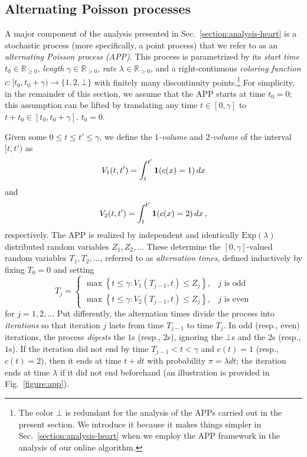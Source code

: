 \documentclass[11pt]{article}
\def\LongVersion{}
\def\LongVersionEnd{}
\def\ShortVersion{}
\def\ShortVersionEnd{}
\theoremstyle{definition}
\theoremstyle{plain}
\theoremstyle{definition}
\theoremstyle{plain}
\theoremstyle{definition}
\theoremstyle{plain}
\newenvironment{MathMaybe}[0]
{\begin{displaymath}\ignorespaces}
{\end{displaymath}\ignorespacesafterend}
\newenvironment{MathMaybe}[0]
{\begin{math}\ignorespaces}
{\end{math}}
\newcommand{\Sect}{Sec.}
\newcommand{\Fig}{Fig.}
\newcommand{\Reals}{\mathbb{R}}
\newcommand{\Indicator}{\mathbf{1}}
\newcommand{\ExpDist}{\mathrm{Exp}}
\begin{document}
\subsection{Alternating Poisson processes}
\label{section:alternating-Poisson-process}
A major component of the analysis presented in
\Sect{}~\ref{section:analysis-heart} is a stochastic process (more
specifically, a point process) that we refer to as an \emph{alternating
Poisson process (APP)}.
This process is parametrized by its
\emph{start time} $t_{0} \in \Reals_{\geq 0}$,
\emph{length} $\gamma \in \Reals_{> 0}$,
\emph{rate} $\lambda \in \Reals_{> 0}$, and
a right-continuous \emph{coloring function}
$c : [t_{0}, t_{0} + \gamma) \rightarrow \{ 1, 2, \bot \}$
with finitely many discontinuity points.\footnote{%
The color $\bot$ is redundant for the analysis of the APPs carried out in the
present section.
We introduce it because it makes things simpler in
\Sect{}~\ref{section:analysis-heart} when we employ the APP framework in the
analysis of our online algorithm.
}
For simplicity, in the remainder of this section, we assume that
the APP starts at time
\LongVersion %
$t_{0} = 0$;
this assumption can be lifted by translating any time
$t \in [0, \gamma]$
to
$t + t_{0} \in [t_{0}, t_{0} + \gamma]$.
\LongVersionEnd %
%
\ShortVersion %
$t_{0} = 0$.
\ShortVersionEnd %

Given some $0 \leq t \leq t' \leq \gamma$, we define the \emph{$1$-volume} and
\emph{$2$-volume} of the interval $[t, t')$ as
\begin{MathMaybe}
V_{1}(t, t') = \int_{t}^{t'} \Indicator(c(x) = 1) \, d x
\end{MathMaybe}
and
\begin{MathMaybe}
V_{2}(t, t') = \int_{t}^{t'} \Indicator(c(x) = 2) \, d x \, ,
\end{MathMaybe}
respectively.
The APP is realized by independent and identically $\ExpDist(\lambda)$
distributed random variables
$Z_{1}, Z_{2}, \dots$
These determine the $[0, \gamma]$-valued random variables
$T_{1}, T_{2}, \dots$,
referred to as \emph{alternation times}, defined inductively by fixing
$T_{0} = 0$
and setting
\[
T_{j}
=
\left\{
\begin{array}{ll}
\max \left\{ t \leq \gamma : V_{1}(T_{j - 1}, t) \leq Z_{j} \right\}, &
\text{$j$ is odd} \\
\max \left\{ t \leq \gamma : V_{2}(T_{j - 1}, t) \leq Z_{j} \right\}, &
\text{$j$ is even}
\end{array}
\right.
\]
for $j = 1, 2, \dots$
Put differently, the alternation times divide the process into
\emph{iterations} so that iteration $j$ lasts from time $T_{j - 1}$ to time
$T_{j}$.
In odd (resp., even) iterations, the process \emph{digests} the $1$s (resp.,
$2$s), ignoring the $\bot$s and the $2$s (resp., $1$s).
If the iteration did not end by time
$T_{j - 1} < t < \gamma$
and
$c(t) = 1$
(resp.,
$c(t) = 2$),
then it ends at time $t + d t$ with probability
$\pi = \lambda d t$;
the iteration ends at time $\lambda$ if it did not end beforehand (an
illustration is provided in \Fig{}~\ref{figure:app}).
\end{document}
